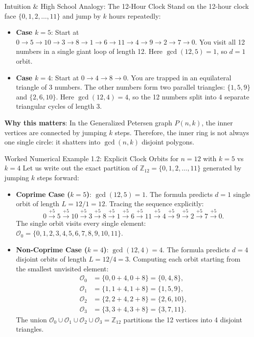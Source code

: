 \documentclass[11pt]{article}
\begin{document}
\begin{intubox}{Intuition \& High School Analogy: The 12-Hour Clock}
Stand on the 12-hour clock face $\{0, 1, 2, \dots, 11\}$ and jump by $k$ hours repeatedly:
\begin{itemize}[leftmargin=*,nosep]
  \item \textbf{Case $k=5$}: Start at $0 \to 5 \to 10 \to 3 \to 8 \to 1 \to 6 \to 11 \to 4 \to 9 \to 2 \to 7 \to 0$. You visit all 12 numbers in a single giant loop of length 12. Here $\gcd(12, 5) = 1$, so $d=1$ orbit.
  \item \textbf{Case $k=4$}: Start at $0 \to 4 \to 8 \to 0$. You are trapped in an equilateral triangle of 3 numbers. The other numbers form two parallel triangles: $\{1, 5, 9\}$ and $\{2, 6, 10\}$. Here $\gcd(12, 4) = 4$, so the 12 numbers split into $4$ separate triangular cycles of length 3.
\end{itemize}
\textbf{Why this matters}: In the Generalized Petersen graph $P(n,k)$, the inner vertices are connected by jumping $k$ steps. Therefore, the inner ring is not always one single circle: it shatters into $\gcd(n, k)$ disjoint polygons.
\end{intubox}

\begin{callbox}{Worked Numerical Example 1.2: Explicit Clock Orbits for $n=12$ with $k=5$ vs $k=4$}
Let us write out the exact partition of $\mathbb{Z}_{12} = \{0, 1, 2, \dots, 11\}$ generated by jumping $k$ steps forward:
\begin{itemize}[leftmargin=*,nosep]
  \item \textbf{Coprime Case ($k=5$)}: $\gcd(12, 5) = 1$. The formula predicts $d = 1$ single orbit of length $L = 12 / 1 = 12$.
  Tracing the sequence explicitly:
  \begin{equation}
    0 \xrightarrow{+5} 5 \xrightarrow{+5} 10 \xrightarrow{+5} 3 \xrightarrow{+5} 8 \xrightarrow{+5} 1 \xrightarrow{+5} 6 \xrightarrow{+5} 11 \xrightarrow{+5} 4 \xrightarrow{+5} 9 \xrightarrow{+5} 2 \xrightarrow{+5} 7 \xrightarrow{+5} 0.
  \end{equation}
  The single orbit visits every single element: $\mathcal{O}_0 = \{0, 1, 2, 3, 4, 5, 6, 7, 8, 9, 10, 11\}$.
  \item \textbf{Non-Coprime Case ($k=4$)}: $\gcd(12, 4) = 4$. The formula predicts $d = 4$ disjoint orbits of length $L = 12 / 4 = 3$.
  Computing each orbit starting from the smallest unvisited element:
  \begin{align}
    \mathcal{O}_0 &= \{0, 0+4, 0+8\} = \{0, 4, 8\}, \\
    \mathcal{O}_1 &= \{1, 1+4, 1+8\} = \{1, 5, 9\}, \\
    \mathcal{O}_2 &= \{2, 2+4, 2+8\} = \{2, 6, 10\}, \\
    \mathcal{O}_3 &= \{3, 3+4, 3+8\} = \{3, 7, 11\}.
  \end{align}
  The union $\mathcal{O}_0 \cup \mathcal{O}_1 \cup \mathcal{O}_2 \cup \mathcal{O}_3 = \mathbb{Z}_{12}$ partitions the 12 vertices into 4 disjoint triangles.
\end{itemize}
\end{callbox}
\end{document}
